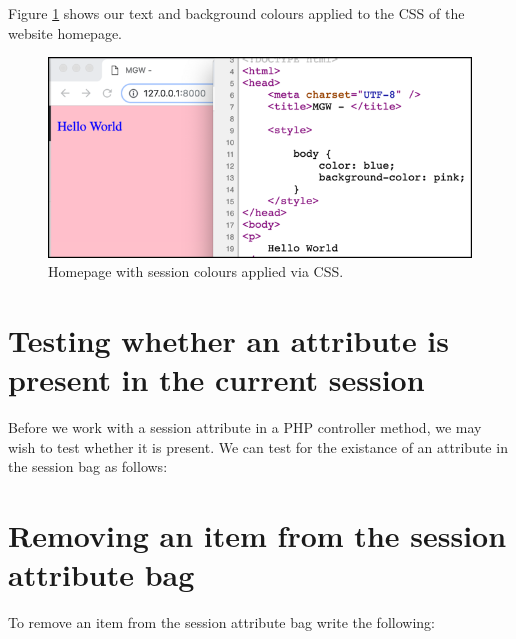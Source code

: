 \documentclass[a4paperpaper,openright]{book}
\newenvironment{Shaded}{}{}
\newcommand{\CommentTok}[1]{\textcolor[rgb]{0.38,0.63,0.69}{\textit{#1}}}
\newcommand{\KeywordTok}[1]{\textcolor[rgb]{0.00,0.44,0.13}{\textbf{#1}}}
\newcommand{\NormalTok}[1]{#1}
\newcommand{\OtherTok}[1]{\textcolor[rgb]{0.00,0.44,0.13}{#1}}
\newcommand{\StringTok}[1]{\textcolor[rgb]{0.25,0.44,0.63}{#1}}
\begin{document}
Figure \ref{colours_css_index} shows our text and background colours
applied to the CSS of the website homepage.

\begin{figure}
\centering
\includegraphics{./tex2pdf.-51e064f4751cea0e/1aca0e32b45d577ec003c85e186871abd9ba9b56.png}
\caption{Homepage with session colours applied via CSS.
\label{colours_css_index}}
\end{figure}

\hypertarget{testing-whether-an-attribute-is-present-in-the-current-session}{%
\section{Testing whether an attribute is present in the current
session}\label{testing-whether-an-attribute-is-present-in-the-current-session}}

Before we work with a session attribute in a PHP controller method, we
may wish to test whether it is present. We can test for the existance of
an attribute in the session bag as follows:

\begin{Shaded}
\end{Shaded}

\hypertarget{removing-an-item-from-the-session-attribute-bag}{%
\section{Removing an item from the session attribute
bag}\label{removing-an-item-from-the-session-attribute-bag}}

To remove an item from the session attribute bag write the following:
\end{document}

